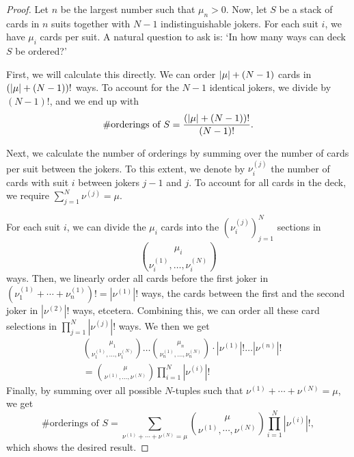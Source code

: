 \begin{proof}
	Let $n$ be the largest number such that $\mu_n>0$.
	Now, let $S$ be a stack of cards in $n$ suits together with $N-1$ indistinguishable jokers.
	For each suit $i$, we have $\mu_i$ cards per suit.
	A natural question to ask is: `In how many ways can deck $S$ be ordered?'
	
	First, we will calculate this directly.
	We can order $\left|\mu\right|+(N-1)$ cards in $(\left|\mu\right|+(N-1))!$ ways.
	To account for the $N-1$ identical jokers, we divide by $(N-1)!$, and we end up with
	\begin{equation*}
		\# \text{orderings of }S = \frac{(\left|\mu\right|+(N-1))!}{(N-1)!}.
	\end{equation*}
	
	Next, we calculate the number of orderings by summing over the number of cards per suit between the jokers.
	To this extent, we denote by $\nu_i^{(j)}$ the number of cards with suit $i$ between jokers $j-1$ and $j$.
	To account for all cards in the deck, we require $\sum_{j=1}^N \nu^{(j)}=\mu$.
	 
	For each suit $i$, we can divide the $\mu_i$ cards into the $(\nu_i^{(j)})_{j=1}^N$ sections in
	\begin{equation*}
		\binom{\mu_i }{ \nu_i^{(1)},\ldots,\nu_i^{(N)}}
	\end{equation*}
	ways.
	Then, we linearly order all cards before the first joker in $(\nu_1^{(1)}+\cdots + \nu_n^{(1)})!=|\nu^{(1)}|!$ ways, the cards between the first and the second joker in $|\nu^{(2)}|!$ ways, etcetera.
	Combining this, we can order all these card selections in $\prod_{j=1}^N |\nu^{(j)}|!$ ways.
	We then we get
	\begin{align*}
		&\binom{\mu_1 }{ \nu_1^{(1)},\ldots,\nu_1^{(N)}}\ldots \binom{\mu_n }{ \nu_n^{(1)},\ldots,\nu_n^{(N)}} \cdot |\nu^{(1)}|! \ldots |\nu^{(n)}|!\\
		&=\binom{\mu }{ \nu^{(1)},\ldots,\nu^{(N)}}\prod_{i=1}^N |\nu^{(i)}|!
	\end{align*}
	Finally, by summing over all possible $N$-tuples such that $\nu^{(1)}+\cdots+\nu^{(N)} = \mu$, we get
	\begin{equation*}
		\# \text{orderings of }S = \sum_{\nu^{(1)}+\cdots+\nu^{(N)}=\mu} \binom{\mu }{ \nu^{(1)},\cdots,\nu^{(N)}}\prod_{i=1}^N |\nu^{(i)}|!,
	\end{equation*}
	which shows the desired result.
\end{proof}


